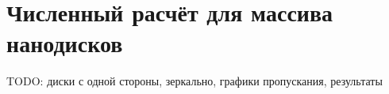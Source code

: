 \section{Численный расчёт для массива нанодисков}

TODO: диски с одной стороны, зеркально, графики пропускания, результаты